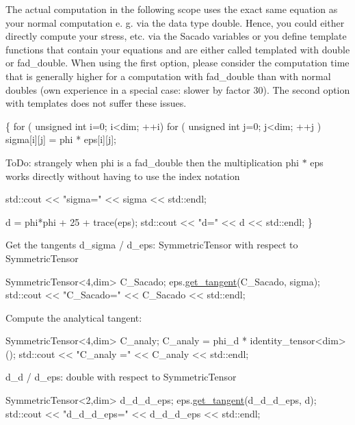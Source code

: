 The actual computation in the following scope uses the exact same equation as your normal computation e. g. via the data type double. Hence, you could either directly compute your stress, etc. via the Sacado variables or you define template functions that contain your equations and are either called templated with double or fad\+\_\+double. When using the first option, please consider the computation time that is generally higher for a computation with fad\+\_\+double than with normal doubles (own experience in a special case\+: slower by factor 30). The second option with templates does not suffer these issues. 
\begin{DoxyCode}
\{
\textcolor{keywordflow}{for} ( \textcolor{keywordtype}{unsigned} \textcolor{keywordtype}{int} i=0; i<dim; ++i)
  \textcolor{keywordflow}{for} ( \textcolor{keywordtype}{unsigned} \textcolor{keywordtype}{int} j=0; j<dim; ++j )
      sigma[i][j] = phi * eps[i][j];
\end{DoxyCode}
 To\+Do\+: strangely when phi is a fad\+\_\+double then the multiplication phi $\ast$ eps works directly without having to use the index notation 
\begin{DoxyCode}
std::cout << \textcolor{stringliteral}{"sigma="} << sigma << std::endl;

d = phi*phi + 25 + trace(eps);
std::cout << \textcolor{stringliteral}{"d="} << d << std::endl;
\}
\end{DoxyCode}
 Get the tangents d\+\_\+sigma / d\+\_\+eps\+: Symmetric\+Tensor with respect to Symmetric\+Tensor 
\begin{DoxyCode}
SymmetricTensor<4,dim> C\_Sacado;
eps.\hyperlink{classSacado__Wrapper_1_1SymTensor_ab97427c3b5cab279e58607cf431ab262}{get\_tangent}(C\_Sacado, sigma);
std::cout << \textcolor{stringliteral}{"C\_Sacado="} << C\_Sacado << std::endl;
\end{DoxyCode}
 Compute the analytical tangent\+: 
\begin{DoxyCode}
SymmetricTensor<4,dim> C\_analy;
C\_analy = phi\_d * identity\_tensor<dim>();
std::cout << \textcolor{stringliteral}{"C\_analy ="} << C\_analy << std::endl;
\end{DoxyCode}
 d\+\_\+d / d\+\_\+eps\+: double with respect to Symmetric\+Tensor 
\begin{DoxyCode}
SymmetricTensor<2,dim> d\_d\_d\_eps;
eps.\hyperlink{classSacado__Wrapper_1_1SymTensor_ab97427c3b5cab279e58607cf431ab262}{get\_tangent}(d\_d\_d\_eps, d);
std::cout << \textcolor{stringliteral}{"d\_d\_d\_eps="} << d\_d\_d\_eps << std::endl;
\end{DoxyCode}
